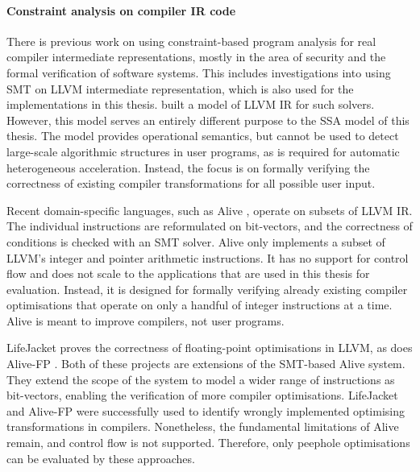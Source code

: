     \paragraph*{Constraint analysis on compiler IR code}
    There is previous work on using constraint-based program analysis for real
    compiler intermediate representations, mostly in the area of security and
    the formal verification of software systems.
    This includes investigations into using SMT on LLVM intermediate
    representation, which is also used for the implementations in this thesis.
    \citet{Zhao:2012:FLI:2103656.2103709} built a model of LLVM IR for such
    solvers.
    However, this model serves an entirely different purpose to the SSA model
    of this thesis.
    The model provides operational semantics, but cannot be used to detect
    large-scale algorithmic structures in user programs, as is required for
    automatic heterogeneous acceleration.
    Instead, the focus is on formally verifying the correctness of existing
    compiler transformations for all possible user input.

    Recent domain-specific languages, such as Alive
    \citep{Lopes:2015:PCP:2737924.2737965}, operate on subsets of LLVM IR.
    The individual instructions are reformulated on bit-vectors, and the
    correctness of conditions is checked with an SMT solver.
    Alive only implements a subset of LLVM's integer and pointer
    arithmetic instructions.
    It has no support for control flow and does not scale to the applications
    that are used in this thesis for evaluation.
    Instead, it is designed for formally verifying already existing
    compiler optimisations that operate on only a handful of integer
    instructions at a time.
    Alive is meant to improve compilers, not user programs.

    LifeJacket \citep{Notzli:2016:LVP:2931021.2931024} proves the correctness of
    floating-point optimisations in LLVM, as does Alive-FP \citep{Menendez2016}.
    Both of these projects are extensions of the SMT-based Alive system.
    They extend the scope of the system to model a wider range of
    instructions as bit-vectors, enabling the verification of more compiler
    optimisations.
    LifeJacket and Alive-FP were successfully used to identify wrongly
    implemented optimising transformations in compilers.
    Nonetheless, the fundamental limitations of Alive remain, and control flow
    is not supported.
    Therefore, only peephole optimisations can be evaluated by these approaches.

